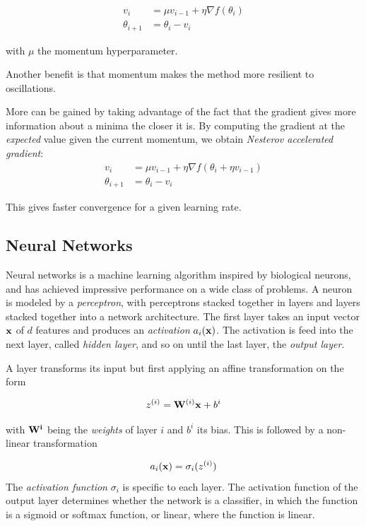 \begin{align*}
  v_{i} &= \mu v_{i-1} + \eta\nabla f(\theta_{i})\\
  \theta_{i+1} &= \theta_{i} - v_{i}
\end{align*}

with \(\mu\) the momentum hyperparameter.

Another benefit is that momentum makes the method more resilient to oscillations.

More can be gained by taking advantage of the fact that the gradient gives more
information about a minima the closer it is. By computing the gradient at the
\textit{expected} value given the current momentum, we obtain \textit{Nesterov
  accelerated gradient}:
\begin{align*}
  v_{i} &= \mu v_{i-1} + \eta\nabla f(\theta_{i} + \eta v_{i-1})\\
  \theta_{i+1} &= \theta_{i} - v_{i}
\end{align*}

This gives faster convergence for a given learning rate.

\subsection{Neural Networks}\label{subsec:neuralnet}

Neural networks is a machine learning algorithm inspired by biological neurons,
and has achieved impressive performance on a wide class of problems. A neuron is
modeled by a \textit{perceptron}, with perceptrons stacked together in layers
and layers stacked together into a network architecture. The first layer takes
an input vector \(\vb{x}\) of \(d\) features and produces an \textit{activation}
\(a_{i}(\vb{x})\). The activation is feed into the next layer, called
\textit{hidden layer}, and so on until
the last layer, the \textit{output layer}.

A layer transforms its input but first applying an
affine transformation on the form

\begin{align*}
  z^{(i)} = \vb{W}^{(i)}\vb{x} + b^{i}
\end{align*}

with \(\vb{W^{i}}\) being the \textit{weights} of layer \(i\) and \(b^{i}\) its
bias. This is followed by a non-linear transformation

\begin{align*}
  a_{i}(\vb{x}) = \sigma_{i}(z^{(i)})
\end{align*}
The \textit{activation function } \(\sigma_{i}\) is specific to each layer. 
The activation function of the output layer determines whether the network is a
classifier, in which the function is a sigmoid or softmax function, or linear,
where the function is linear.

